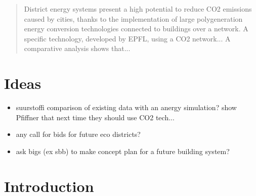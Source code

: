 \documentclass{article}
\begin{document}


\newpage
\null
\thispagestyle{empty} %
\clearpage

\listoftodos
\newpage

\begin{abstract}
District energy systems present a high potential to reduce CO2 emissions caused by cities, thanks to the implementation of large polygeneration energy conversion technologies connected to buildings over a network.
A specific technology, developed by EPFL, using a CO2 network...
A comparative analysis shows that...
\end{abstract}

\newpage
\tableofcontents
\thispagestyle{empty} 




\setcounter{page}{1}
\renewcommand{\thepage}{\arabic{page}}
\newpage

\section*{Ideas}
\begin{itemize}
\item suurstoffi comparison of existing data with an anergy simulation? show Pfiffner that next time they should use CO2 tech...
\item any call for bids for future eco districts?
\item ask bigs (ex sbb) to make concept plan for a future building system?
\end{itemize}

\section{Introduction}
\end{document}
